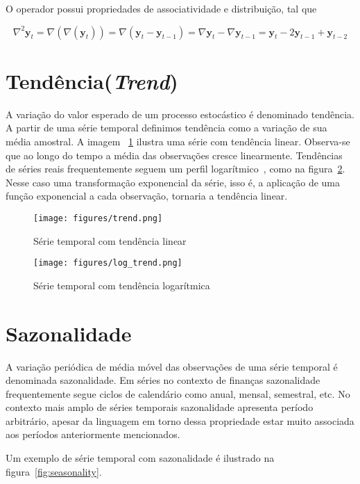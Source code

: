 O operador possui propriedades de associatividade e distribuição, tal que

$$ \nabla^2 \mathbf{y}_t = \nabla(\nabla(\mathbf{y}_t)) = \nabla(\mathbf{y}_t - \mathbf{y}_{t-1}) = \nabla \mathbf{y}_t - \nabla \mathbf{y}_{t-1} = \mathbf{y}_t - 2 \mathbf{y}_{t-1} + \mathbf{y}_{t-2} $$

\section{Tendência(\emph{Trend})}

A variação do valor esperado de um processo estocástico é denominado tendência.
A partir de uma série temporal definimos tendência como a variação de sua média
amostral. A imagem ~\ref{fig:trend} ilustra uma série com tendência linear.
Observa-se que ao longo do tempo a média das observações cresce linearmente.
Tendências de séries reais frequentemente seguem um perfil
logarítmico~\cite{chatfield}, como na figura~\ref{fig:log_trend}. Nesse caso
uma transformação exponencial da série, isso é, a aplicação de uma função
exponencial a cada observação, tornaria a tendência linear.

\begin{figure}[H]
    \centering
    \texttt{[image: figures/trend.png]}
    \caption{Série temporal com tendência linear}
    \label{fig:trend}
\end{figure}

\begin{figure}[H]
    \centering
    \texttt{[image: figures/log\_trend.png]}
    \caption{Série temporal com tendência logarítmica}
    \label{fig:log_trend}
\end{figure}

\section{Sazonalidade}\label{sec:seasonality}

A variação periódica de média móvel das observações de uma série temporal é
denominada sazonalidade. Em séries no contexto de finanças sazonalidade
frequentemente segue ciclos de calendário como anual, mensal, semestral, etc.
No contexto mais amplo de séries temporais sazonalidade apresenta período
arbitrário, apesar da linguagem em torno dessa propriedade estar muito
associada aos períodos anteriormente mencionados.

Um exemplo de série temporal com sazonalidade é ilustrado na
figura~\ref{fig:seasonality}.

